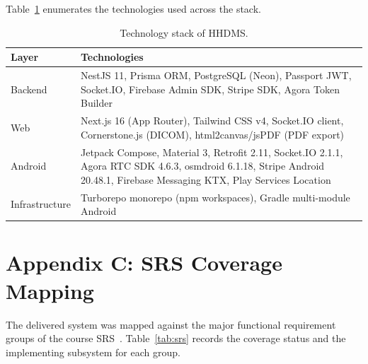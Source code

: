 \documentclass[conference]{IEEEtran}
\begin{document}
Table~\ref{tab:stack} enumerates the technologies used across the stack.

\begin{table}[H]
\centering
\small
\renewcommand{\arraystretch}{1.2}
\begin{tabularx}{\textwidth}{>{\raggedright\arraybackslash}p{} >{\raggedright\arraybackslash}X}
\toprule
\textbf{Layer} & \textbf{Technologies} \\
\midrule
Backend & NestJS 11, Prisma ORM, PostgreSQL (Neon), Passport JWT, Socket.IO, Firebase Admin SDK, Stripe SDK, Agora Token Builder \\
Web & Next.js 16 (App Router), Tailwind CSS v4, Socket.IO client, Cornerstone.js (DICOM), html2canvas/jsPDF (PDF export) \\
Android & Jetpack Compose, Material 3, Retrofit 2.11, Socket.IO 2.1.1, Agora RTC SDK 4.6.3, osmdroid 6.1.18, Stripe Android 20.48.1, Firebase Messaging KTX, Play Services Location \\
Infrastructure & Turborepo monorepo (npm workspaces), Gradle multi-module Android \\
\bottomrule
\end{tabularx}
\caption{Technology stack of HHDMS.}
\label{tab:stack}
\end{table}

\section*{Appendix C: SRS Coverage Mapping}

The delivered system was mapped against the major functional requirement groups of the course SRS~\cite{srs2026}. Table~\ref{tab:srs} records the coverage status and the implementing subsystem for each group.
\end{document}
